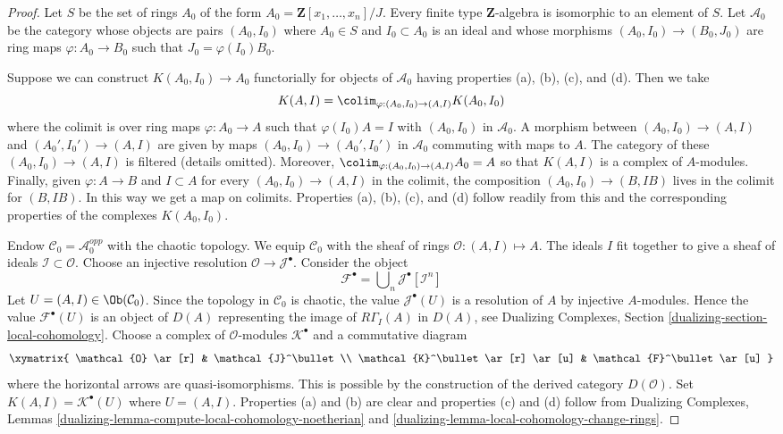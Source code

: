 \begin{proof}
Let $S$ be the set of rings $A_0$ of the form
$A_0 = \mathbf{Z}[x_1, \ldots, x_n]/J$.
Every finite type $\mathbf{Z}$-algebra is isomorphic to
an element of $S$. Let $\mathcal{A}_0$ be the category whose objects
are pairs $(A_0, I_0)$ where $A_0 \in S$ and $I_0 \subset A_0$
is an ideal and whose morphisms $(A_0, I_0) \to (B_0, J_0)$ are
ring maps $\varphi : A_0 \to B_0$ such that $J_0 = \varphi(I_0)B_0$.

\medskip\noindent
Suppose we can construct $K(A_0, I_0) \to A_0$ functorially for
objects of $\mathcal{A}_0$ having properties (a), (b), (c), and (d).
Then we take
$$
K(A, I) = \colim_{\varphi : (A_0, I_0) \to (A, I)} K(A_0, I_0)
$$
where the colimit is over ring maps $\varphi : A_0 \to A$ such
that $\varphi(I_0)A = I$ with $(A_0, I_0)$ in $\mathcal{A}_0$.
A morphism between $(A_0, I_0) \to (A, I)$ and $(A_0', I_0') \to (A, I)$
are given by maps $(A_0, I_0) \to (A_0', I_0')$ in $\mathcal{A}_0$
commuting with maps to $A$.
The category of these $(A_0, I_0) \to (A, I)$ is filtered
(details omitted). Moreover, $\colim_{\varphi : (A_0, I_0) \to (A, I)} A_0 = A$
so that $K(A, I)$ is a complex of $A$-modules.
Finally, given $\varphi : A \to B$ and $I \subset A$
for every $(A_0, I_0) \to (A, I)$ in the colimit, the composition
$(A_0, I_0) \to (B, IB)$ lives in the colimit for $(B, IB)$.
In this way we get a map on colimits. Properties (a), (b), (c), and (d)
follow readily from this and the corresponding
properties of the complexes $K(A_0, I_0)$.

\medskip\noindent
Endow $\mathcal{C}_0 = \mathcal{A}_0^{opp}$ with the chaotic topology.
We equip $\mathcal{C}_0$ with the sheaf of rings
$\mathcal{O} : (A, I) \mapsto A$. The ideals $I$ fit together to give a
sheaf of ideals $\mathcal{I} \subset \mathcal{O}$.
Choose an injective resolution $\mathcal{O} \to \mathcal{J}^\bullet$.
Consider the object
$$
\mathcal{F}^\bullet = \bigcup\nolimits_n \mathcal{J}^\bullet[\mathcal{I}^n]
$$
Let $U = (A, I) \in \Ob(\mathcal{C}_0)$.
Since the topology in $\mathcal{C}_0$ is chaotic, the value
$\mathcal{J}^\bullet(U)$ is a resolution of $A$ by injective
$A$-modules. Hence the value $\mathcal{F}^\bullet(U)$ is an
object of $D(A)$ representing the image of $R\Gamma_I(A)$ in $D(A)$, see
Dualizing Complexes, Section \ref{dualizing-section-local-cohomology}.
Choose a complex of $\mathcal{O}$-modules $\mathcal{K}^\bullet$
and a commutative diagram
$$
\xymatrix{
\mathcal{O} \ar[r] & \mathcal{J}^\bullet \\
\mathcal{K}^\bullet \ar[r] \ar[u] & \mathcal{F}^\bullet \ar[u]
}
$$
where the horizontal arrows are quasi-isomorphisms. This is possible
by the construction of the derived category $D(\mathcal{O})$.
Set $K(A, I) = \mathcal{K}^\bullet(U)$ where $U = (A, I)$.
Properties (a) and (b) are clear and properties (c) and (d)
follow from Dualizing Complexes, Lemmas
\ref{dualizing-lemma-compute-local-cohomology-noetherian} and
\ref{dualizing-lemma-local-cohomology-change-rings}.
\end{proof}

